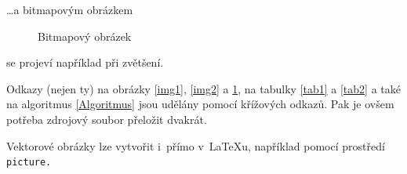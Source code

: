 \documentclass[11pt,a4paper]{article}
\begin{document}
\noindent \dots a bitmapovým obrázkem

\begin{figure}[h]
    \centering
        \caption{Bitmapový obrázek}
        \label{img3}
\end{figure}

\noindent se projeví například při zvětšení.

Odkazy (nejen ty) na obrázky \ref{img1}, \ref{img2} a \ref{img3}, na tabulky \ref{tab1} a \ref{tab2} a také na algoritmus \ref{Algoritmus} jsou udělány pomocí křížových odkazů. Pak je ovšem potřeba zdrojový soubor přeložit dvakrát.

Vektorové obrázky lze vytvořit i~přímo v~{\LaTeX}u, například pomocí prostředí\texttt{ picture.}
\end{document}
